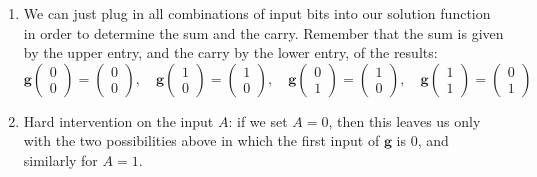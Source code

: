 \begin{gradedsolution}
\begin{enumerate}
\begin{equation}
	= \begin{pmatrix} a \oplus b \\ a \wedge b\end{pmatrix},
	\label{eq:string_of_equations}
      \end{equation}
      which forces the equalities $g_S \begin{pmatrix} a \\ b\end{pmatrix} = a \oplus b$ and $g_C \begin{pmatrix} a \\ b\end{pmatrix} = a \wedge b$. 
      This shows uniqueness, and by construction, this is indeed a valid solution function.
    \item We can just plug in all combinations of input bits into our solution function in order to determine the sum and the carry. Remember that the sum is given by the upper entry, and the carry by the lower entry, of the results:
      \begin{equation}
	\boldsymbol{g} \begin{pmatrix} 0 \\ 0\end{pmatrix} = \begin{pmatrix} 0 \\ 0\end{pmatrix}, \quad 
	\boldsymbol{g}  \begin{pmatrix} 1 \\ 0\end{pmatrix} = \begin{pmatrix} 1 \\ 0\end{pmatrix}, \quad 
	\boldsymbol{g}  \begin{pmatrix} 0 \\ 1\end{pmatrix} = \begin{pmatrix} 1 \\ 0\end{pmatrix}, \quad 
	\boldsymbol{g} \begin{pmatrix} 1 \\ 1\end{pmatrix} = \begin{pmatrix} 0 \\ 1\end{pmatrix}
	\label{eq:sums_and_carries}
      \end{equation}
    \item Hard intervention on the input $A$: if we set $A = 0$, then this leaves us only with the two possibilities above in which the first input of $\boldsymbol{g}$ is $0$, and similarly for $A = 1$.

\end{enumerate}
\end{gradedsolution}
